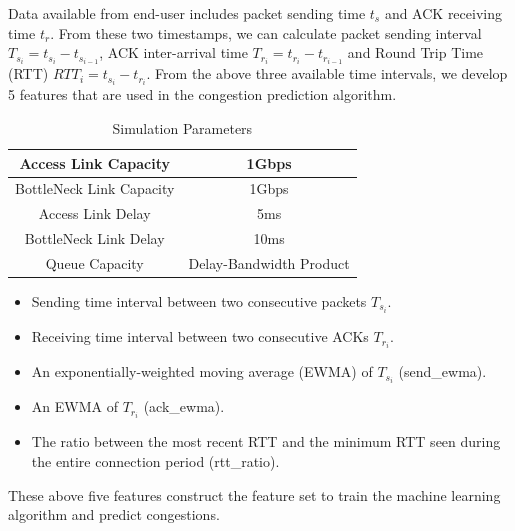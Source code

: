 \par Data available from end-user includes packet sending time $t_{s}$ and ACK receiving time $t_{r}$. From these two timestamps, we can calculate packet sending interval $T_{s_{i}} = t_{s_{i}} - t_{s_{i-1}}$, ACK inter-arrival time $T_{r_{i}} = t_{r_{i}} - t_{r_{i-1}}$ and Round Trip Time (RTT) $RTT_{i} = t_{s_{i}} - t_{r_{i}}$. From the above three available time intervals, we develop 5 features that are used in the congestion prediction algorithm.
\begin{table}
\begin{center}
\caption {Simulation Parameters} \label{tab:simuPara}
\begin{tabular}{ |c|c| }
 \hline
 Access Link Capacity & 1Gbps  \\
 \hline
 BottleNeck Link Capacity & 1Gbps  \\
 \hline
 Access Link Delay & 5ms  \\
 \hline
 BottleNeck Link Delay & 10ms\\
 \hline
 Queue Capacity & Delay-Bandwidth Product\\
 \hline
\end{tabular}
\end{center}
\end{table}
\begin{itemize}
\item Sending time interval between two consecutive packets $T_{s_{i}}$.
\item Receiving time interval between two consecutive ACKs $T_{r_{i}}$.
\item An exponentially-weighted moving average (EWMA) of $T_{s_{i}}$ (send\_ewma).
\item An EWMA of $T_{r_{i}}$ (ack\_ewma).
\item The ratio between the most recent RTT and the minimum RTT seen during the entire connection period (rtt\_ratio).
\end{itemize}

These above five features construct the feature set to train the machine learning algorithm and predict congestions.


